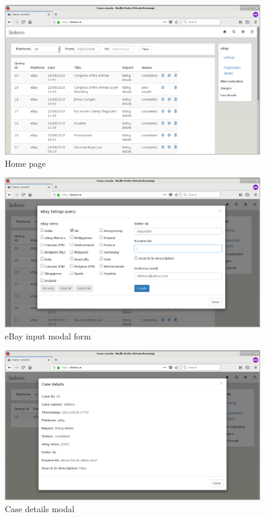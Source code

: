 \begin{figure}[H]
\centering
\includegraphics[scale=0.3]{imgs/HomeScreen.png}
\caption{Home page}
\label{fig:home}
\end{figure}

\begin{figure}[H]
\centering
\includegraphics[scale=0.3]{imgs/InputForm.png}
\caption{eBay input modal form}
\label{fig:inputform}
\end{figure}

\begin{figure}[H]
\centering
\includegraphics[scale=0.3]{imgs/case_details.png}
\caption{Case details modal}
\label{fig:casedetails}
\end{figure}

